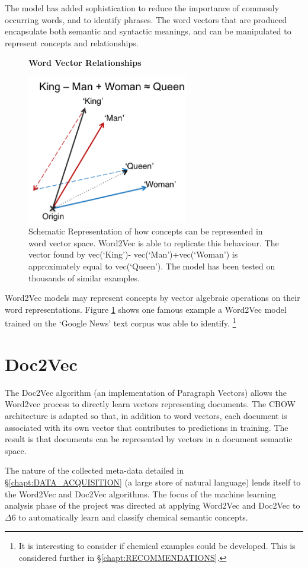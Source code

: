 The model has added sophistication to reduce the importance of commonly occurring words, and to identify phrases. The word vectors that are produced encapsulate both semantic and syntactic meanings, and can be manipulated to represent concepts and relationships.
\begin{figure}[H]
    \centering
    \textbf{Word Vector Relationships}\par\medskip
    \includegraphics[height=6.5cm]{Natural_Language_Processing/KINGQUEEN.png}
    \caption[Word Vector Relationships]{Schematic Representation of how concepts can be represented in word vector space. Word2Vec is able to replicate this behaviour. The vector found by vec(‘King’)- vec(‘Man’)+vec(‘Woman’) is approximately equal to vec(‘Queen’). The model has been tested on thousands of similar examples\cite{word2vec2}\cite{word2veckingqueen}.}
     \label{fig:KINGQUEEN}
\end{figure}
Word2Vec models may represent concepts by vector algebraic operations on their word representations. Figure \ref{fig:KINGQUEEN} shows one famous example a Word2Vec model trained on the `Google News' text corpus was able to identify. \footnote{It is interesting to consider if chemical examples could be developed. This is considered further in \S\ref{chapt:RECOMMENDATIONS}.}

\section{Doc2Vec}
The Doc2Vec algorithm\cite{gensim} (an implementation of Paragraph Vectors\cite{doc2vec}) allows the Word2vec process to directly learn vectors representing documents. The CBOW architecture is adapted so that, in addition to word vectors, each document is associated with its own vector that contributes to predictions in training. The result is that documents can be represented by vectors in a document semantic space.

The nature of the collected meta-data detailed in \S\ref{chapt:DATA_ACQUISITION} (a large store of natural language) lends itself to the Word2Vec and Doc2Vec algorithms. The focus of the machine learning analysis phase of the project was directed at applying Word2Vec and Doc2Vec to $\Delta6$ to automatically learn and classify chemical semantic concepts.